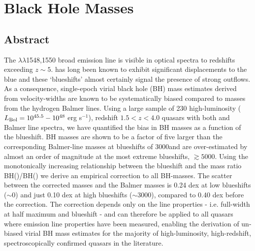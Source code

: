 \chapter{Black Hole Masses}\label{ch:bhmass} %

\section{Abstract}

The $\lambda\lambda$1548,1550 broad emission line is visible in optical spectra to redshifts exceeding $z\sim5$. 
 has long been known to exhibit significant displacements to the blue and these `blueshifts' almost certainly signal the presence of strong outflows.
As a consequence, single-epoch virial black hole (BH) mass estimates derived from  velocity-widths are known to be systematically biased compared to masses from the hydrogen Balmer lines. 
Using a large sample of 230 high-luminosity ($L_{\rm Bol} = 10^{45.5}-10^{48}$ erg s$^{-1}$), redshift $1.5 < z < 4.0$ quasars with both  and Balmer line spectra, we have quantified the bias in  BH masses as a function of the  blueshift. 
 BH masses are shown to be a factor of five larger than the corresponding Balmer-line masses at  blueshifts of 3000\kms and are over-estimated by almost an order of magnitude at the most extreme blueshifts, $\gtrsim 5000$\kms.
Using the monotonically increasing relationship between the  blueshift and the mass ratio BH()/BH(\hans) we derive an empirical correction to all  BH-masses.
The scatter between the corrected  masses and the Balmer masses is 0.24 dex at low  blueshifts ($\sim$0\kms) and just 0.10 dex at high blueshifts ($\sim$3000\kms), compared to 0.40 dex before the correction. 
The correction depends only on the  line properties - i.e. full-width at half maximum and blueshift - and can therefore be applied to all quasars where  emission line properties have been measured, enabling the derivation of un-biased virial BH mass estimates for the majority of high-luminosity, high-redshift, spectroscopically confirmed quasars in the literature. 

